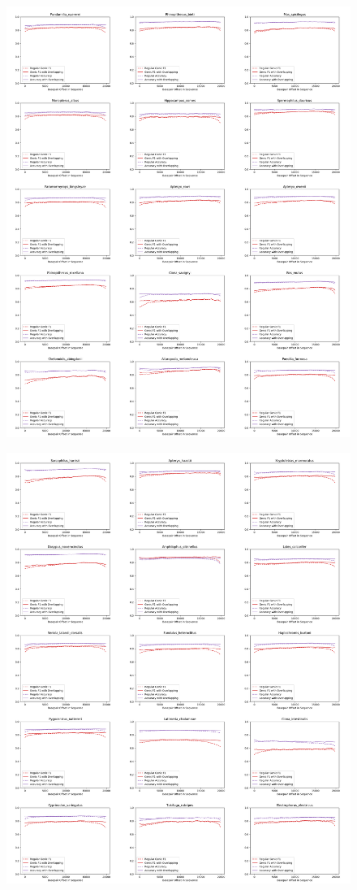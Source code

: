 \documentclass{article}
\begin{document}
\begin{figure}[!h]
\centerline{\includegraphics[width=1.2\textwidth]{images/overlapping/montage_animals10}}
\end{figure}
\begin{figure}[!h]
\centerline{\includegraphics[width=1.2\textwidth]{images/overlapping/montage_animals11}}
\end{figure}
\end{document}
